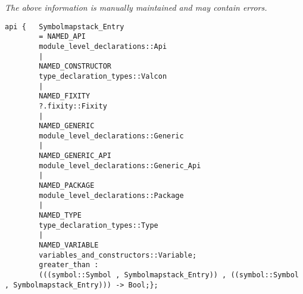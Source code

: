 \label{api:Symbolmapstack\_Entry}

{\tiny \it The above information is manually maintained and may contain errors.}
\begin{verbatim}
api {   Symbolmapstack_Entry
        = NAMED_API
        module_level_declarations::Api
        |
        NAMED_CONSTRUCTOR
        type_declaration_types::Valcon
        |
        NAMED_FIXITY
        ?.fixity::Fixity
        |
        NAMED_GENERIC
        module_level_declarations::Generic
        |
        NAMED_GENERIC_API
        module_level_declarations::Generic_Api
        |
        NAMED_PACKAGE
        module_level_declarations::Package
        |
        NAMED_TYPE
        type_declaration_types::Type
        |
        NAMED_VARIABLE
        variables_and_constructors::Variable;
        greater_than :
        (((symbol::Symbol , Symbolmapstack_Entry)) , ((symbol::Symbol , Symbolmapstack_Entry))) -> Bool;};
\end{verbatim}
